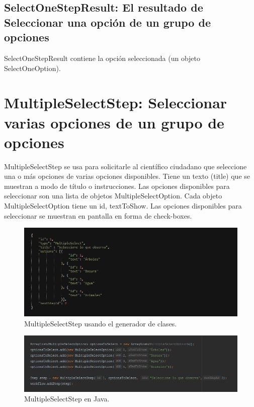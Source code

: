 \subsection{SelectOneStepResult: El resultado de Seleccionar una opción de un grupo de opciones}
SelectOneStepResult contiene la opción seleccionada (un objeto SelectOneOption).





\section{MultipleSelectStep: Seleccionar varias opciones de un grupo de opciones}
MultipleSelectStep  se usa para solicitarle al científico ciudadano que seleccione una o más opciones de varias opciones disponibles. Tiene un texto (title) que se muestran a modo de título o instrucciones. Las opciones disponibles para seleccionar son una lista de objetos MultipleSelectOption.
Cada objeto MultipleSelectOption tiene un id, textToShow.
Las opciones disponibles para seleccionar se muestran en pantalla en forma de check-boxes.


\begin{figure}[H]
  \centering
    \includegraphics[scale=0.6]{50-anexos/C-steps/multiple_select_json.png} 
    \caption{MultipleSelectStep usando el generador de clases.}
\end{figure}	

\begin{figure}[H]
  \centering
    \includegraphics[scale=0.6]{50-anexos/C-steps/multiple_select_java.png} 
    \caption{MultipleSelectStep en Java.}
\end{figure}

